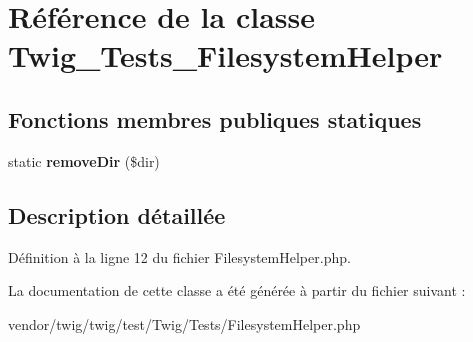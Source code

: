 \hypertarget{class_twig___tests___filesystem_helper}{}\section{Référence de la classe Twig\+\_\+\+Tests\+\_\+\+Filesystem\+Helper}
\label{class_twig___tests___filesystem_helper}
\subsection*{Fonctions membres publiques statiques}
\begin{DoxyCompactItemize}
\item 
static {\bfseries remove\+Dir} (\$dir)\hypertarget{class_twig___tests___filesystem_helper_a96d051a16d6d9ca63637fa4b4d5e4062}{}\label{class_twig___tests___filesystem_helper_a96d051a16d6d9ca63637fa4b4d5e4062}

\end{DoxyCompactItemize}


\subsection{Description détaillée}


Définition à la ligne 12 du fichier Filesystem\+Helper.\+php.



La documentation de cette classe a été générée à partir du fichier suivant \+:\begin{DoxyCompactItemize}
\item 
vendor/twig/twig/test/\+Twig/\+Tests/Filesystem\+Helper.\+php\end{DoxyCompactItemize}
